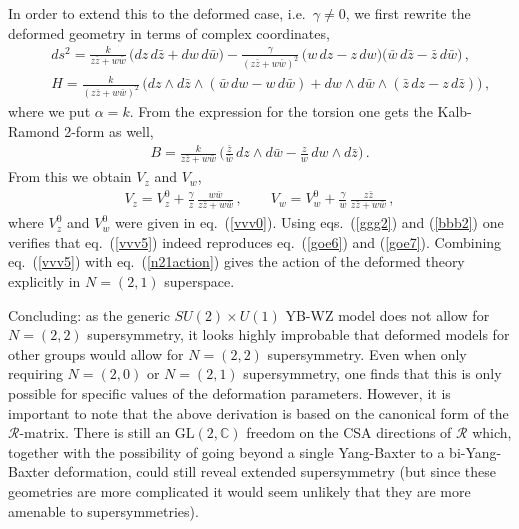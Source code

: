 \documentclass[12pt]{article}
\def\R{{\mathbb R}}
\renewcommand{\R}{\mathcal{R}}
\begin{document}
In order to extend this to the deformed case, i.e.\ $\gamma \neq 0$, we first rewrite the deformed geometry in terms of complex coordinates,
\begin{eqnarray}
&&ds^2 = \frac{k}{z \bar{z} + w \bar{w} }\, \Big( d z\, d \bar {z}+d w \,d\bar{w}  \Big) - \frac{\gamma}{(z \bar{z} + w \bar{w})^2}\, \Big(w\,dz -z\, dw \Big)\Big(\bar w\, d \bar z-\bar z \,d\bar w \Big)\,, \nonumber\\
&&H= \frac{k}{ (z \bar{z} + w \bar{w} )^2}\,  \Big( d z \wedge d \bar z  \wedge (\bar w \,d w  -w \,d \bar w) +d w \wedge d \bar w \wedge (\bar z\, d z  -z\,  d \bar z)   \Big)\,,\label{goe6}
\end{eqnarray} 
where we put $\alpha =k$.
From the expression for the torsion one gets the Kalb-Ramond 2-form as well,
\begin{eqnarray}
B= \frac{k}{z\bar z +w\bar w}\,\Big( \frac{\bar z}{\bar w}\,d z \wedge d\bar w-\frac{ z}{ w}\,d w \wedge d\bar z
\Big)\,.\label{goe7}
\end{eqnarray} 
From this we  obtain $V_z$ and $V_w$,
\begin{eqnarray}
V_z =V^0_z  + \frac{\gamma}{z } \,\frac{w \bar{w} } {z \bar{z}+ w \bar{w}}    \, ,  \qquad V_w = V^0_w + \frac{\gamma}{w } \,\frac{z \bar{z} } { z \bar{z}+w \bar{w}}    \,  ,\label{vvv5}
\end{eqnarray} 
where $V^0_z$ and $V^0_w$ were given in eq.~(\ref{vvv0}). Using eqs.~(\ref{ggg2})  and (\ref{bbb2}) one verifies that eq.~(\ref{vvv5}) indeed reproduces eq.~(\ref{goe6})  and (\ref{goe7}). Combining eq.~(\ref{vvv5}) with eq.~(\ref{n21action}) gives the action of the deformed theory explicitly in $N=(2,1)$ superspace.

Concluding: as the  generic $SU(2)\times U(1)$ YB-WZ model does not allow for $N=(2,2)$ supersymmetry, it looks highly improbable that deformed models for other groups would allow for $N=(2,2)$ supersymmetry. Even when only requiring $N=(2,0)$ or $N=(2,1)$ supersymmetry, one finds that this is only possible for specific values of the deformation parameters. However, it is important to note that the above derivation is based on the canonical form of the $\R$-matrix. There is still an $\mathrm{GL}(2,\mathbb{C})$ freedom on the CSA directions of $\R$ which,  together with the possibility of going beyond a single Yang-Baxter to a bi-Yang-Baxter deformation, could still reveal extended supersymmetry (but since these geometries are more complicated it would seem unlikely that they are more amenable to supersymmetries). 
\end{document}
